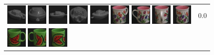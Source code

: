 \begin{figure}[tbp]
\begin{center}
\begin{tabular}{m{11cm} | m{3cm} |}
\includegraphics[width=1cm]{coil/beeld-25.eps} 
\includegraphics[width=1cm]{coil/beeld-28.eps} 
\includegraphics[width=1cm]{coil/beeld-27.eps} 
\includegraphics[width=1cm]{coil/beeld-26.eps} 
\includegraphics[width=1cm]{coil/beeld-29.eps} 
\includegraphics[width=1cm]{coil/beeld-9.eps} 
\includegraphics[width=1cm]{coil/beeld-7.eps} 
\includegraphics[width=1cm]{coil/beeld-11.eps} 
\includegraphics[width=1cm]{coil/beeld-8.eps} & {\scriptsize 0.0} \\ 
\includegraphics[width=1cm]{coil/beeld-30.eps} 
\includegraphics[width=1cm]{coil/beeld-31.eps} 
\includegraphics[width=1cm]{coil/beeld-32.eps} 

\end{tabular}
\end{center}
\end{figure}
